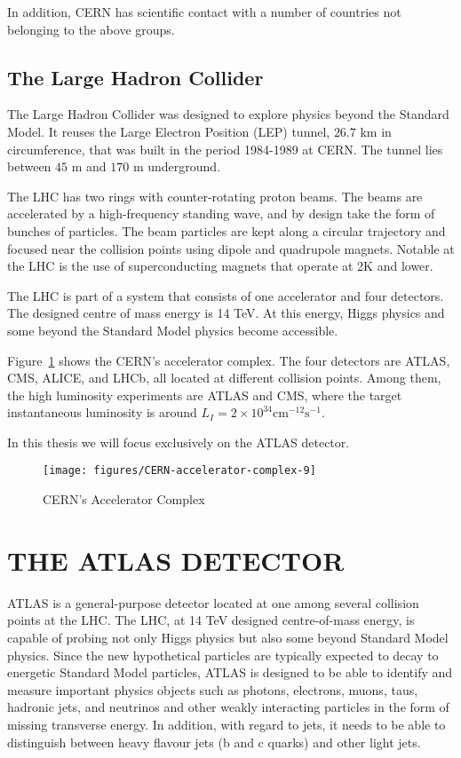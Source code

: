 In addition, CERN has scientific contact with a number of countries not
belonging to the above groups.


\subsection{The Large Hadron Collider}

The Large Hadron Collider \cite{lhclink} was designed to explore physics beyond
the Standard Model. It reuses the Large Electron Position (LEP) tunnel, $26.7$
km in circumference, that was built in the period 1984-1989 at CERN. The tunnel
lies between $45$ m and $170$ m underground.

The LHC has two rings with counter-rotating proton beams. The beams are
accelerated by a high-frequency standing wave, and by design take the form of
bunches of particles. The beam particles are kept along a circular trajectory
and focused near the collision points using dipole and quadrupole magnets.
Notable at the LHC is the use of superconducting magnets that operate at 2K and
lower.

The LHC is part of a system that consists of one accelerator and four
detectors. The designed centre of mass energy is 14 TeV. At this energy, Higgs
physics and some beyond the Standard Model physics become accessible.

Figure~\ref{f:lhcmap} shows the CERN's accelerator complex. The four detectors
are ATLAS, CMS, ALICE, and LHCb, all located at different collision points.
Among them, the high luminosity experiments are ATLAS and CMS, where the target
instantaneous luminosity is around $L_I=2 \times
	10^{34}\text{cm}^{-12}\text{s}^{-1}$.

In this thesis we will focus exclusively on the ATLAS detector.

\begin{figure}[H]
	\texttt{[image: figures/CERN-accelerator-complex-9]}
	\centering
	\caption{CERN's Accelerator Complex} \cite{acccomplex}
	\label{f:lhcmap}
\end{figure}


\section{THE ATLAS DETECTOR}

ATLAS \cite{lhcaccexp} is a general-purpose detector located at one among
several collision points at the LHC. The LHC, at 14 TeV designed centre-of-mass
energy, is capable of probing not only Higgs physics but also some beyond
Standard Model physics. Since the new hypothetical particles are typically
expected to decay to energetic Standard Model particles, ATLAS is designed to
be able to identify and measure important physics objects such as photons,
electrons, muons, taus, hadronic jets, and neutrinos and other weakly
interacting particles in the form of missing transverse energy. In addition,
with regard to jets, it needs to be able to distinguish between heavy flavour
jets (b and c quarks) and other light jets.

